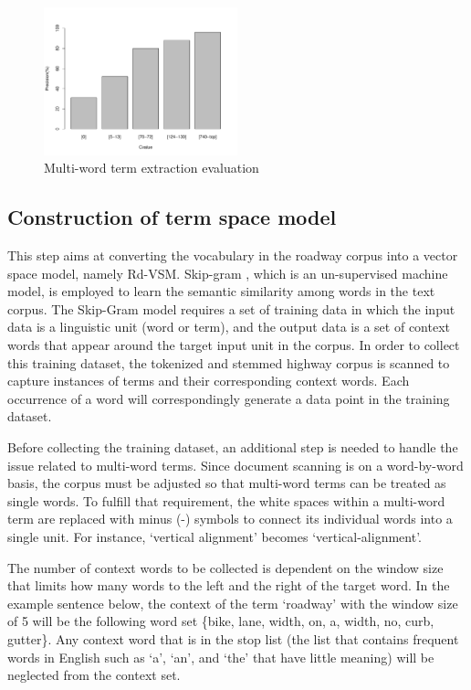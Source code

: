 \documentclass[Journal, BackFigs, DoubleSpace]{ascelike}%
\begin{document}
\begin{figure}[t]
	\centering
	\includegraphics[width=0.5\textwidth]{Figure3_term_precision}
	\caption{Multi-word term extraction evaluation}
	\label{fig:term_precision}
\end{figure}
%
\subsection{Construction of term space model}
%
This step aims at converting the vocabulary in the roadway corpus into a vector space model, namely Rd-VSM. Skip-gram \cite{mikolov13a}, which is an un-supervised machine model, is employed to learn the semantic similarity among words in the text corpus. The Skip-Gram model requires a set of training data in which the input data is a linguistic unit (word or term), and the output data is a set of context words that appear around the target input unit in the corpus. In order to collect this training dataset, the tokenized and stemmed highway corpus is scanned to capture instances of terms and their corresponding context words. Each occurrence of a word will correspondingly generate a data point in the training dataset.
\par
Before collecting the training dataset, an additional step is needed to handle the issue related to multi-word terms. Since document scanning is on a word-by-word basis, the corpus must be adjusted so that multi-word terms can be treated as single words. To fulfill that requirement, the white spaces within a multi-word term are replaced with minus (-) symbols to connect its individual words into a single unit. For instance, `vertical alignment' becomes `vertical-alignment'.
\par
The number of context words to be collected is dependent on the window size that limits how many words to the left and the right of the target word. In the example sentence below, the context of the term `roadway' with the window size of 5 will be the following word set \{bike, lane, width, on, a, width, no, curb, gutter\}. Any context word that is in the stop list (the list that contains frequent words in English such as `a', `an', and `the' that have little meaning) will be neglected from the context set.
\end{document}
